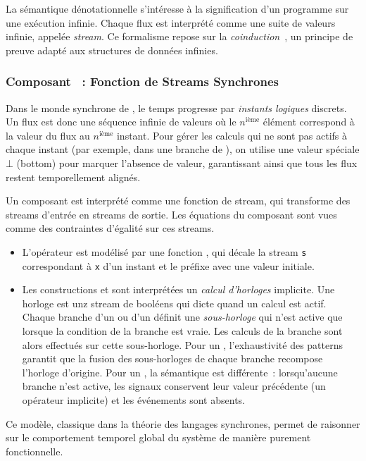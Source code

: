 La sémantique dénotationnelle s'intéresse à la signification d'un programme sur une exécution
infinie. Chaque flux est interprété comme une suite de valeurs infinie, appelée \emph{stream}. Ce
formalisme repose sur la \emph{coinduction}~\cite{DBLP:journals/mscs/KozenS17}, un principe de
preuve adapté aux structures de données infinies.

\subsubsection{Composant \GRSync~: Fonction de Streams Synchrones}

Dans le monde synchrone de \GRSync, le temps progresse par \emph{instants logiques} discrets. Un
flux est donc une séquence infinie de valeurs où le $n^\text{ième}$ élément correspond à la valeur
du flux au $n^\text{ième}$ instant. Pour gérer les calculs qui ne sont pas actifs à chaque instant
(par exemple, dans une branche de ), on utilise une valeur spéciale $\bot$ (bottom) pour
marquer l'absence de valeur, garantissant ainsi que tous les flux restent temporellement alignés.

Un composant est interprété comme une fonction de stream, qui transforme des streams d'entrée en
streams de sortie. Les équations du composant sont vues comme des contraintes d'égalité sur ces
streams.
\begin{itemize}
      \item L'opérateur  est modélisé par une fonction
            , qui décale la stream \texttt{s} correspondant à
            \texttt{x} d'un instant et le préfixe avec une valeur initiale.

      \item Les constructions  et  sont interprétées \via un \emph{calcul
                  d'horloges} implicite. Une horloge est unz stream de booléens qui dicte quand un
            calcul est actif. Chaque branche d'un  ou d'un  définit une
            \emph{sous-horloge} qui n'est active que lorsque la condition de la branche est vraie.
            Les calculs de la branche sont alors effectués sur cette sous-horloge. Pour un
            , l'exhaustivité des patterns garantit que la fusion des sous-horloges de
            chaque branche recompose l'horloge d'origine. Pour un , la sémantique est
            différente~: lorsqu'aucune branche n'est active, les signaux conservent leur valeur
            précédente (\via un opérateur  implicite) et les événements sont absents.
\end{itemize}
Ce modèle, classique dans la théorie des langages synchrones, permet de raisonner sur le
comportement temporel global du système de manière purement fonctionnelle.

